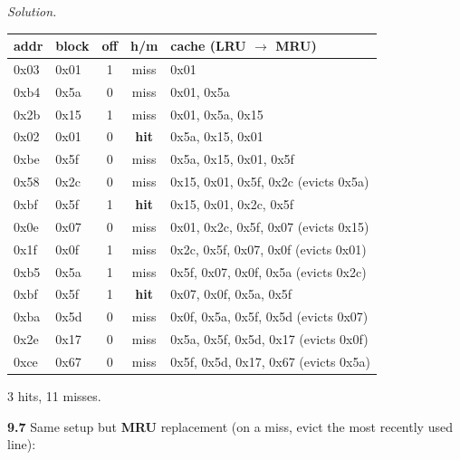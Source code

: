 \documentclass[12pt]{article}
\newenvironment{solution}{\par\noindent\textit{Solution.}\ }{\par\vspace{1.1em}}
\newcommand{\subproblem}[1]{\par\vspace{0.45em}\noindent\textbf{#1}\quad}
\begin{document}
\begin{solution}
\begin{center}\small
\begin{tabular}{@{}llccl@{}}\toprule
addr & block & off & h/m & cache (LRU $\to$ MRU) \\\midrule
0x03 & 0x01 & 1 & miss & 0x01 \\
0xb4 & 0x5a & 0 & miss & 0x01, 0x5a \\
0x2b & 0x15 & 1 & miss & 0x01, 0x5a, 0x15 \\
0x02 & 0x01 & 0 & \textbf{hit}  & 0x5a, 0x15, 0x01 \\
0xbe & 0x5f & 0 & miss & 0x5a, 0x15, 0x01, 0x5f \\
0x58 & 0x2c & 0 & miss & 0x15, 0x01, 0x5f, 0x2c (evicts 0x5a) \\
0xbf & 0x5f & 1 & \textbf{hit}  & 0x15, 0x01, 0x2c, 0x5f \\
0x0e & 0x07 & 0 & miss & 0x01, 0x2c, 0x5f, 0x07 (evicts 0x15) \\
0x1f & 0x0f & 1 & miss & 0x2c, 0x5f, 0x07, 0x0f (evicts 0x01) \\
0xb5 & 0x5a & 1 & miss & 0x5f, 0x07, 0x0f, 0x5a (evicts 0x2c) \\
0xbf & 0x5f & 1 & \textbf{hit}  & 0x07, 0x0f, 0x5a, 0x5f \\
0xba & 0x5d & 0 & miss & 0x0f, 0x5a, 0x5f, 0x5d (evicts 0x07) \\
0x2e & 0x17 & 0 & miss & 0x5a, 0x5f, 0x5d, 0x17 (evicts 0x0f) \\
0xce & 0x67 & 0 & miss & 0x5f, 0x5d, 0x17, 0x67 (evicts 0x5a) \\
\bottomrule\end{tabular}\end{center}
3 hits, 11 misses.

\subproblem{9.7} Same setup but \textbf{MRU} replacement (on a miss, evict the most recently used line):


\end{solution}
\end{document}
